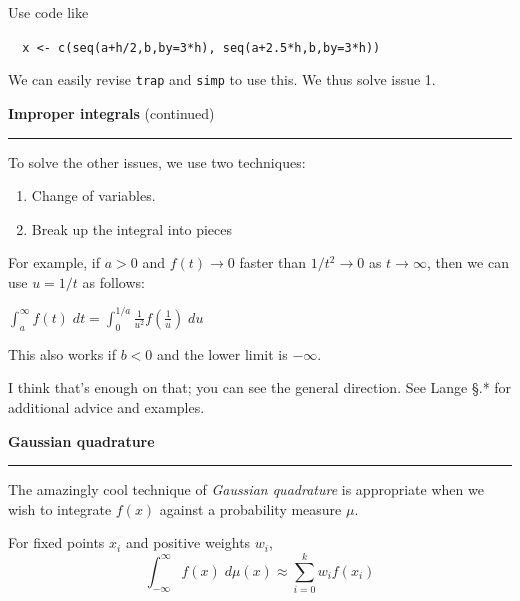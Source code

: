 \documentclass[12pt,letterpaper]{article}
\newcommand{\HRule}{\rule{\linewidth}{4pt}}
\newcommand{\hspone}{\hspace*{1cm}}
\newcommand{\vsphalf}{\vspace*{0.5cm}}
\begin{document}
Use code like

{\Large \verb|  x <- c(seq(a+h/2,b,by=3*h), seq(a+2.5*h,b,by=3*h))|}

\smallskip

We can easily revise \verb|trap| and \verb|simp| to use this.  We thus
solve issue 1.




\newpage

\fontsize{30}{30} \selectfont

\centerline{\textbf{Improper integrals} (continued)}

\HRule

\vsphalf

\fontsize{20}{25} \selectfont

To solve the other issues, we use two techniques:
\begin{enumerate}
\item Change of variables.
\item Break up the integral into pieces
\end{enumerate}

\bigskip

For example, if $a > 0$ and $f(t) \to 0$ faster than $1/t^2 \to 0$ as
$t \to \infty$, then we can use $u = 1/t$ as follows:

\bigskip

\hspone $\int_a^\infty f(t) \; dt = \int_{0}^{1/a} \frac{1}{u^2}
f(\frac{1}{u}) \; du$

\bigskip

This also works if $b < 0$ and the lower limit is $-\infty$.

\bigskip

I think that's enough on that; you can see the general direction.  See
Lange \S *.* for additional advice and examples.





\newpage

\fontsize{30}{30} \selectfont

\centerline{\textbf{Gaussian quadrature}}

\HRule

\vsphalf

\fontsize{20}{25} \selectfont

The amazingly cool technique of \emph{Gaussian quadrature\/} is
appropriate when we wish to integrate $f(x)$ against a probability
measure $\mu$.

\bigskip

For fixed points $x_i$ and positive weights $w_i$,
$$ \int_{-\infty}^{\infty} f(x) \; d\mu(x) \approx \sum_{i=0}^{k}
w_i f(x_i)$$
\end{document}
